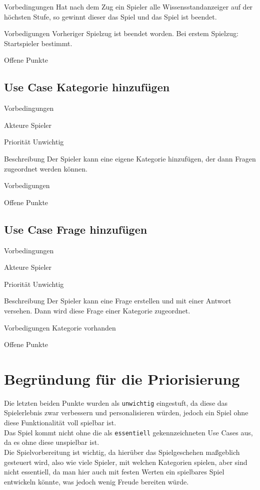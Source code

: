 \begin{labeling}[:]{Vorbedingungen}
Hat nach dem Zug ein Spieler alle Wissensstandanzeiger auf der höchsten Stufe, so gewinnt dieser das Spiel und das Spiel ist beendet.
\item [Vorbedigungen] Vorheriger Spielzug ist beendet worden. Bei erstem Spielzug: Startspieler bestimmt.
\item [Offene Punkte]
\end{labeling}

\subsection{Use Case Kategorie hinzufügen}
\begin{labeling}[:]{Vorbedingungen}
\item [Akteure] Spieler
\item [Priorität] Unwichtig
\item [Beschreibung] Der Spieler kann eine eigene Kategorie hinzufügen, der dann Fragen zugeordnet werden können.
\item [Vorbedigungen]
\item [Offene Punkte]
\end{labeling}

\subsection{Use Case Frage hinzufügen}
\begin{labeling}[:]{Vorbedingungen}
\item [Akteure] Spieler
\item [Priorität] Unwichtig
\item [Beschreibung] Der Spieler kann eine Frage erstellen und mit einer Antwort versehen. Dann wird diese Frage einer Kategorie zugeordnet.
\item [Vorbedigungen] Kategorie vorhanden
\item [Offene Punkte]
\end{labeling}

\section{Begründung für die Priorisierung}\label{sec:begruendung-prio}
Die letzten beiden Punkte wurden als \texttt{unwichtig} eingestuft, da diese das Spielerlebnis zwar verbessern und personalisieren würden, jedoch ein Spiel ohne diese Funktionalität voll spielbar ist.\\
Das Spiel kommt nicht ohne die als \texttt{essentiell} gekennzeichneten Use Cases aus, da es ohne diese unspielbar ist.\\
Die Spielvorbereitung ist wichtig, da hierüber das Spielgeschehen maßgeblich gesteuert wird, also wie viele Spieler, mit welchen Kategorien spielen, aber sind nicht essentiell, da man hier auch mit festen Werten ein spielbares Spiel entwickeln könnte, was jedoch wenig Freude bereiten würde.

